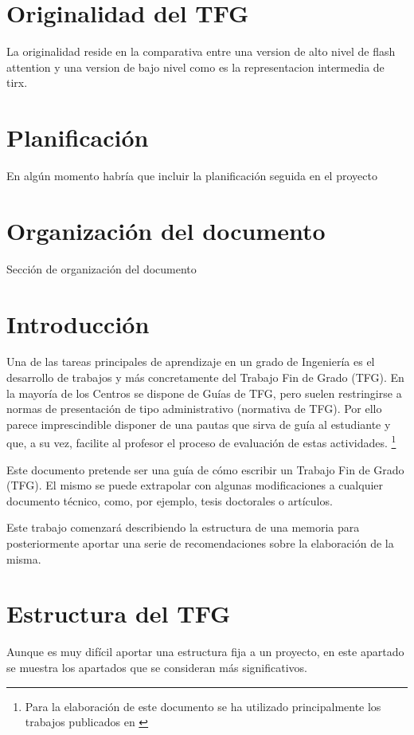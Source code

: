\begin{list}
\section{Originalidad del TFG}
La originalidad reside en la comparativa entre una version de alto nivel de flash attention y una version de bajo nivel como es la representacion intermedia de tirx.

\section{Planificación}
En algún momento habría que incluir la planificación seguida en el proyecto
\section{Organización del documento}
Sección de organización del documento

\section{Introducción }

Una de las tareas principales de aprendizaje en un grado de Ingeniería
es el desarrollo de trabajos y más concretamente del Trabajo Fin de
Grado (TFG). En la mayoría de los Centros se dispone de Guías de TFG,
pero suelen restringirse a normas de presentación de tipo administrativo
(normativa de TFG). Por ello parece imprescindible disponer de una
pautas que sirva de guía al estudiante y que, a su vez, facilite al
profesor el proceso de evaluación de estas actividades. \footnote{Para la elaboración de este documento se ha utilizado principalmente
los trabajos publicados en \cite{tfg_alicante,pfc}}

Este documento pretende ser una guía de cómo escribir un Trabajo Fin
de Grado (TFG). El mismo se puede extrapolar con algunas modificaciones
a cualquier documento técnico, como, por ejemplo, tesis doctorales
o artículos. 

Este trabajo comenzará describiendo la estructura de una memoria para
posteriormente aportar una serie de recomendaciones sobre la elaboración
de la misma.

\section{Estructura del TFG}

Aunque es muy difícil aportar una estructura fija a un proyecto, en
este apartado se muestra los apartados que se consideran más significativos. 


\end{list}
